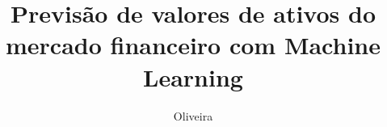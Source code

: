\documentclass[tc,oneside]{tcc}
\title{Previsão de valores de ativos do mercado financeiro com Machine Learning}
\author{Oliveira}{Mauricio de Avila}
\begin{document}
\maketitle

\renewcommand{\titlepagespecificinfo}{Monografia apresentada como requisito parcial para obtenção do t\'itulo de Tecn\'ologo em Sistemas para Internet.}

\makefacepage

\clearpage


% 

% 








% 

\tableofcontents










\begin{singlespace}
\begin{flushleft}



\end{flushleft}
\end{singlespace}




\renewcommand{\appendixname}{AP\^ENDICE~}
% 	
% 	
\end{document}

